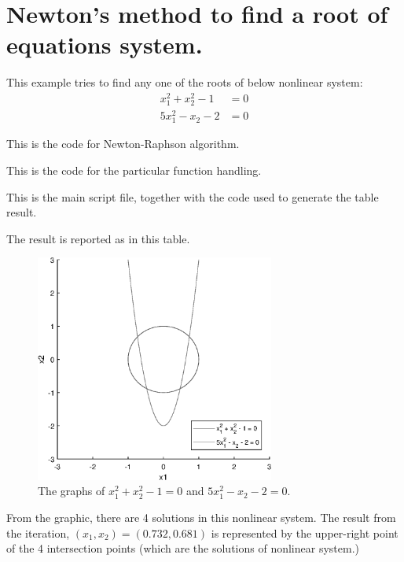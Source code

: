 \documentclass{article}
\begin{document}
\section*{Newton's method to find a root of equations system.}

This example tries to find any one of the roots of below nonlinear system:
\begin{align*}
    x_1^2 + x_2^2 - 1 &= 0 \\
    5x_1^2 - x_2 - 2 &= 0
\end{align*}

This is the code for Newton-Raphson algorithm.



This is the code for the particular function handling.



This is the main script file, together with the code used to generate the table result.



The result is reported as in this table.



\begin{figure}[h]
    \centering
    \includegraphics[width = 0.7\textwidth]{graph}
    \caption{The graphs of $x_1^2 + x_2^2 - 1 = 0$ and $5x_1^2 - x_2 - 2 = 0$.}
\end{figure}

From the graphic, there are 4 solutions in this nonlinear system. The result from the iteration, $(x_1,x_2) = (0.732,0.681)$ is represented by the upper-right point of the 4 intersection points (which are the solutions of nonlinear system.) 
\end{document}
